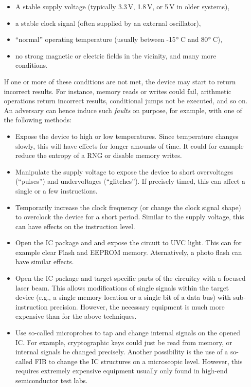 \begin{itemize}
	\item A stable supply voltage (typically 3.3\,V, 1.8\,V, or 5\,V in older systems),
	\item a stable clock signal (often supplied by an external oscillator),
	\item ``normal'' operating temperature (usually between -15$^\circ$\,C and 80$^\circ$\,C),
	\item no strong magnetic or electric fields in the vicinity, and many more conditions.
\end{itemize}

If one or more of these conditions are not met, the device may start to return incorrect results. For instance, memory reads or writes could fail, arithmetic operations return incorrect results, conditional jumps not be executed, and so on. An adversary can hence induce such \emph{faults} on purpose, for example, with one of the following methods:

\begin{itemize}
  \item Expose the device to high or low temperatures. Since temperature changes slowly, this will have effects for longer amounts of time. It could for example reduce the entropy of a \ac{RNG} or disable memory writes. 
	
	\item Manipulate the supply voltage to expose the device to short overvoltages (``pulses'') and undervoltages (``glitches''). If precisely timed, this can affect a single or a few instructions.
	
	\item Temporarily increase the clock frequency (or change the clock signal shape) to overclock the device for a short period. Similar to the supply voltage, this can have effects on the instruction level.
	
	\item Open the \ac{IC} package and and expose the circuit to \ac{UVC} light. This can for example clear Flash and \ac{EEPROM} memory. Aternatively, a photo flash can have similar effects.
	
	\item Open the \ac{IC} package and target specific parts of the circuitry with a focused laser beam. This allows modifications of single signals within the target device (e.g., a single memory location or a single bit of a data bus) with sub-instruction precision. However, the necessary equipment is much more expensive than for the above techniques.
	
	\item Use so-called microprobes to tap and change internal signals on the opened \ac{IC}. For example, cryptographic keys could just be read from memory, or internal signals be changed precisely. Another possibility is the use of a so-called \ac{FIB} to change the \ac{IC} structures on a microscopic level. However, this requires extremely expensive equipment usually only found in high-end semiconductor test labs.
\end{itemize}

